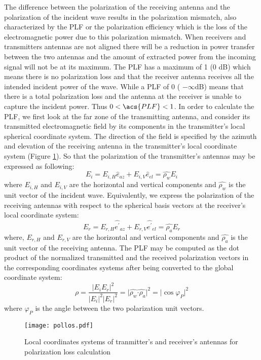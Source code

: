 The difference between the polarization of the receiving antenna and the polarization of the incident wave results in the polarization mismatch, also characterized by the \acf{PLF} or the polarization efficiency which is the loss of the electromagnetic power due to this polarization mismatch. When receivers and transmitters antennas are not aligned there will be a reduction in power transfer between the two antennas and the amount of extracted power from the incoming signal will not be at its maximum. The \acs{PLF} has a maximum of 1 (0 dB) which means there is no polarization loss and that the receiver antenna receives all the intended incident power of the wave. While a \acs{PLF} of 0 ( $ -\infty $dB) means that there is a total polarization loss and the antenna at the receiver is unable to capture the incident power. Thus  $0<\acs{PLF}<1$. In order to calculate the \acs{PLF}, we first look at the far zone of the transmitting antenna, and consider its transmitted electromagnetic field by its components in the transmitter's local spherical coordinate system. The direction of the field is specified by the azimuth and elevation of the receiving antenna in the transmitter's local coordinate system (Figure \ref{pollos}). So that the polarization of the transmitter's antennas may be expressed as following:
\begin{equation}
E_{i}= E_{i,H}\hat{e}_{az}+ E_{i,V}\hat{e}_{el}= \widehat{ \rho _{w}}E_{i} \label{eq_pollos}
\end{equation} 
where $E_{i,H}$ and  $E_{i,V}$  are the horizontal and vertical components and  $\widehat{ \rho _{w}}$ is the unit vector of the incident wave. Equivalently, we express the polarization of the receiving antennas with respect to the spherical basis vectors at the receiver's local coordinate system:  
\begin{equation}
E_{r}= E_{r,H}\widehat{e^{'}}_{az}+ E_{r,V}\widehat{e^{'}}_{el}= \widehat{ \rho _{a}}E_{r}
\end{equation}
where,  $E_{r,H}$ and $E_{r,V}$ are the horizontal and vertical components and $\widehat{ \rho _{a}}$ is the unit vector of the receiving antenna. The \acs{PLF} may be computed as the dot product of the normalized transmitted and the received polarization vectors in the corresponding coordinates systems after being converted to the global coordinate system:
\begin{equation}
\rho =\frac{ \vert E_{i}E_{r} \vert ^{2}}{ \vert E_{i} \vert ^{2} \vert E_{r} \vert ^{2}}=  \vert \widehat{ \rho _{w}}\widehat{ \cdot  \rho _{a}} \vert ^{2}=  \vert \cos  \varphi _{P} \vert ^{2}
\end{equation}
where $\varphi _{P}$ is the angle between the two polarization unit vectors.
\begin{figure}[H]
\vspace{-1cm} 
	\begin{center}
		\texttt{[image: pollos.pdf]}
	\vspace{-2cm} 	\caption{\label{pollos} Local coordinates systems of tranmitter's and receiver's antennas for polarization loss calculation}
	\end{center}
\end{figure}


